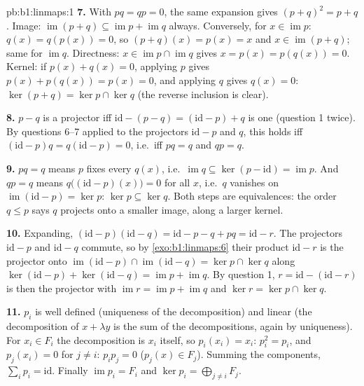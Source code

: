 \begin{solution}{pb:b1:linmaps:1}
\textbf{7.} With $pq = qp = 0$, the same expansion gives $(p +
q)^2 = p + q$. Image: $\operatorname{im}(p + q) \subseteq
\operatorname{im} p + \operatorname{im} q$ always. Conversely,
for $x \in \operatorname{im} p$: $q(x) = q(p(x)) = 0$, so $(p +
q)(x) = p(x) = x$ and $x \in \operatorname{im}(p+q)$; same for
$\operatorname{im} q$. Directness: $x \in \operatorname{im} p
\cap \operatorname{im} q$ gives $x = p(x) = p(q(x)) = 0$.
Kernel: if $p(x) + q(x) = 0$, applying $p$ gives $p(x) +
p(q(x)) = p(x) = 0$, and applying $q$ gives $q(x) = 0$: $\ker(p
+ q) = \ker p \cap \ker q$ (the reverse inclusion is clear).

\textbf{8.} $p - q$ is a projector iff $\mathrm{id} - (p - q) =
(\mathrm{id} - p) + q$ is one (question 1 twice). By questions
6--7 applied to the projectors $\mathrm{id} - p$ and $q$, this
holds iff $(\mathrm{id} - p)q = q(\mathrm{id} - p) = 0$, i.e.\
iff $pq = q$ and $qp = q$.

\textbf{9.} $pq = q$ means $p$ fixes every $q(x)$, i.e.\
$\operatorname{im} q \subseteq \ker(p - \mathrm{id}) =
\operatorname{im} p$. And $qp = q$ means $q\bigl((\mathrm{id} -
p)(x)\bigr) = 0$ for all $x$, i.e.\ $q$ vanishes on
$\operatorname{im}(\mathrm{id} - p) = \ker p$: $\ker p \subseteq
\ker q$. Both steps are equivalences: the order $q \leq p$ says
$q$ projects onto a smaller image, along a larger kernel.

\textbf{10.} Expanding, $(\mathrm{id} - p)(\mathrm{id} - q) =
\mathrm{id} - p - q + pq = \mathrm{id} - r$. The projectors
$\mathrm{id} - p$ and $\mathrm{id} - q$ commute, so by
\cref{exo:b1:linmaps:6} their product $\mathrm{id} - r$ is the
projector onto $\operatorname{im}(\mathrm{id} - p) \cap
\operatorname{im}(\mathrm{id} - q) = \ker p \cap \ker q$ along
$\ker(\mathrm{id} - p) + \ker(\mathrm{id} - q) =
\operatorname{im} p + \operatorname{im} q$. By question 1, $r =
\mathrm{id} - (\mathrm{id} - r)$ is then the projector with
$\operatorname{im} r = \operatorname{im} p + \operatorname{im}
q$ and $\ker r = \ker p \cap \ker q$.

\textbf{11.} $p_i$ is well defined (uniqueness of the
decomposition) and linear (the decomposition of $x + \lambda y$
is the sum of the decompositions, again by uniqueness). For $x_i
\in F_i$ the decomposition is $x_i$ itself, so $p_i(x_i) = x_i$:
$p_i^2 = p_i$, and $p_j(x_i) = 0$ for $j \neq i$: $p_i p_j = 0$
($p_j(x) \in F_j$). Summing the components, $\sum_i p_i =
\mathrm{id}$. Finally $\operatorname{im} p_i = F_i$ and $\ker
p_i = \bigoplus_{j \neq i} F_j$.


\end{solution}
